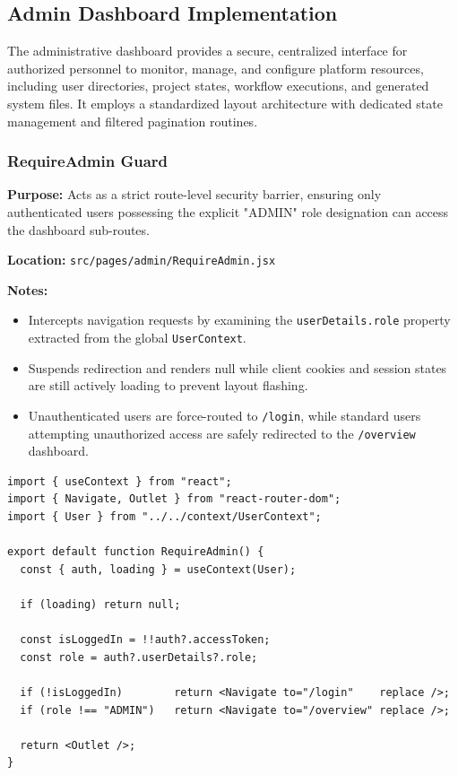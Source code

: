 \subsection{Admin Dashboard Implementation}
The administrative dashboard provides a secure, centralized interface for authorized personnel to monitor, manage, and configure platform resources, including user directories, project states, workflow executions, and generated system files. It employs a standardized layout architecture with dedicated state management and filtered pagination routines.

\subsubsection{RequireAdmin Guard}

\textbf{Purpose:} Acts as a strict route-level security barrier, ensuring only authenticated users possessing the explicit "ADMIN" role designation can access the dashboard sub-routes.

\vspace{0.2cm}
\noindent\textbf{Location:} \texttt{src/pages/admin/RequireAdmin.jsx}

\vspace{0.2cm}
\noindent\textbf{Notes:}
\begin{itemize}
    \item Intercepts navigation requests by examining the \texttt{userDetails.role} property extracted from the global \texttt{UserContext}.
    \item Suspends redirection and renders null while client cookies and session states are still actively loading to prevent layout flashing.
    \item Unauthenticated users are force-routed to \texttt{/login}, while standard users attempting unauthorized access are safely redirected to the \texttt{/overview} dashboard.
\end{itemize}

\begin{lstlisting}
import { useContext } from "react";
import { Navigate, Outlet } from "react-router-dom";
import { User } from "../../context/UserContext";

export default function RequireAdmin() {
  const { auth, loading } = useContext(User);

  if (loading) return null;

  const isLoggedIn = !!auth?.accessToken;
  const role = auth?.userDetails?.role;

  if (!isLoggedIn)        return <Navigate to="/login"    replace />;
  if (role !== "ADMIN")   return <Navigate to="/overview" replace />;

  return <Outlet />;
}
\end{lstlisting}

